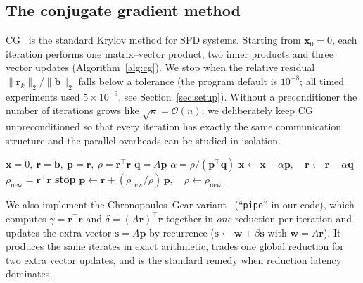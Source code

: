 \documentclass[11pt,a4paper]{article}
\begin{document}
\subsection{The conjugate gradient method}
CG~\cite{hestenes1952} is the standard Krylov method for SPD systems. Starting from $\mathbf x_0=0$,
each iteration performs one matrix--vector product, two inner products and three vector
updates (Algorithm~\ref{alg:cg}). We stop when the relative residual
$\|\mathbf r_k\|_2/\|\mathbf b\|_2$ falls below a tolerance (the program default is $10^{-8}$; all timed experiments used $5\times10^{-9}$, see Section~\ref{sec:setup}).
Without a preconditioner the number of iterations grows like $\sqrt{\kappa}=\mathcal O(n)$;
we deliberately keep CG unpreconditioned so that every iteration has exactly the same
communication structure and the parallel overheads can be studied in isolation.

\begin{algorithm}[H]
\caption{Standard CG (``\texttt{std}''): two global reductions per iteration}\label{alg:cg}
\begin{algorithmic}[1]
\State $\mathbf x=0,\ \mathbf r=\mathbf b,\ \mathbf p=\mathbf r,\ \rho=\mathbf r^{\top}\mathbf r$
  \State $\mathbf q = A\mathbf p$ 
  \State $\alpha=\rho/(\mathbf p^{\top}\mathbf q)$ 
  \State $\mathbf x \gets \mathbf x+\alpha\mathbf p,\quad \mathbf r\gets\mathbf r-\alpha\mathbf q$
  \State $\rho_{\text{new}}=\mathbf r^{\top}\mathbf r$ 
   \textbf{stop} \EndIf
  \State $\mathbf p\gets\mathbf r+(\rho_{\text{new}}/\rho)\,\mathbf p,\quad \rho\gets\rho_{\text{new}}$
\EndFor
\end{algorithmic}
\end{algorithm}

We also implement the Chronopoulos--Gear variant~\cite{chronopoulos1989} (``\texttt{pipe}'' in
our code), which computes $\gamma=\mathbf r^{\top}\mathbf r$ and $\delta=(A\mathbf r)^{\top}\mathbf r$
together in \emph{one} reduction per iteration and updates the extra vector
$\mathbf s=A\mathbf p$ by recurrence ($\mathbf s\gets\mathbf w+\beta\mathbf s$ with $\mathbf w=A\mathbf r$).
It produces the same iterates in exact arithmetic, trades one global reduction for two extra
vector updates, and is the standard remedy when reduction latency dominates.
\end{document}
